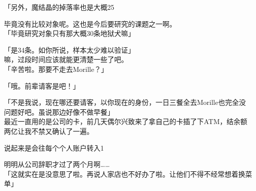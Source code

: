 「另外，魔结晶的掉落率也是大概25%

毕竟没有比较对象呢。这也是今后要研究的课题之一啊。\\

「毕竟研究对象只有那大概30条地狱犬嘛」

「是34条。如你所说，样本太少难以验证」\\

嘛，过段时间应该就能更清楚一些了吧。\\

「辛苦啦。那要不走去Morille？」

「哦。前辈请客是吧！」

「不是我说，现在哪还要请客，以你现在的身份，一日三餐全去Morille也完全没问题好吧。虽说那边好像不做早餐」\\

最近一直用的是公司的卡，前几天偶尔兴致来了拿自己的卡插了下ATM，结余额两亿让我不禁又确认了一遍。

说起来是会往每个个人账户转入1%

明明从公司辞职才过了两个月啊……\\

「这就实在是没意思了啦。再说人家店也不好办了啦。让他们不得不经常想着换菜单」


